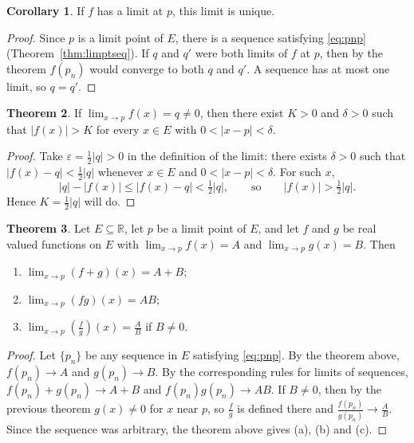 \documentclass[11pt,a4paper]{article}
\numberwithin{equation}{section}
\theoremstyle{definition}
\newtheorem{thm}{Theorem}[subsection]
\newtheorem{coro}[thm]{Corollary}
\begin{document}
\begin{coro}
If $f$ has a limit at $p$, this limit is unique.
\end{coro}

\begin{proof}
Since $p$ is a limit point of $E$, there is a sequence satisfying \eqref{eq:pnp} (Theorem~\ref{thm:limptseq}). If $q$ and $q'$ were both limits of $f$ at $p$, then by the theorem $f(p_n)$ would converge to both $q$ and $q'$. A sequence has at most one limit, so $q = q'$.
\end{proof}


\begin{thm}
If $\lim_{x\rightarrow p} f(x) = q \neq 0$, then there exist $K > 0$ and $\delta > 0$ such that $|f(x)| > K$ for every $x\in E$ with $0<|x - p| < \delta$.
\end{thm}

\begin{proof}
Take $\varepsilon = \frac{1}{2}|q|>0$ in the definition of the limit: there exists $\delta > 0$ such that $|f(x) - q| < \frac{1}{2}|q|$ whenever $x\in E$ and $0 < |x - p|< \delta$. For such $x$,
$$|q| - |f(x)| \leq |f(x) - q| < \tfrac{1}{2}|q|, \qquad\text{so}\qquad |f(x)| > \tfrac{1}{2}|q| .$$
Hence $K = \frac{1}{2}|q|$ will do.
\end{proof}


\begin{thm}
Let $E\subseteq\mathbb{R}$, let $p$ be a limit point of $E$, and let $f$ and $g$ be real valued functions on $E$ with $\lim_{x\rightarrow p} f(x) = A$ and $\lim_{x\rightarrow p} g(x) = B$. Then
\begin{enumerate}
\item[(a)] $\lim_{x\rightarrow p} (f + g)(x) = A + B$;
\item[(b)] $\lim_{x\rightarrow p} (fg)(x) = AB$;
\item[(c)] $\lim_{x\rightarrow p} \left(\frac{f}{g}\right)(x) = \frac{A}{B}$ if $B\neq 0$.
\end{enumerate}
\end{thm}

\begin{proof}
Let $\{p_n\}$ be any sequence in $E$ satisfying \eqref{eq:pnp}. By the theorem above, $f(p_n)\longrightarrow A$ and $g(p_n)\longrightarrow B$. By the corresponding rules for limits of sequences, $f(p_n)+g(p_n)\longrightarrow A+B$ and $f(p_n)g(p_n)\longrightarrow AB$. If $B\neq 0$, then by the previous theorem $g(x)\neq 0$ for $x$ near $p$, so $\frac{f}{g}$ is defined there and $\frac{f(p_n)}{g(p_n)}\longrightarrow \frac{A}{B}$. Since the sequence was arbitrary, the theorem above gives (a), (b) and (c).
\end{proof}
\end{document}
